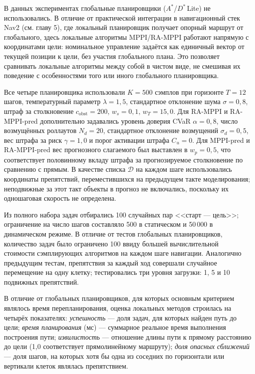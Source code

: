 \documentclass[a4paper,12pt]{extarticle}
\begin{document}
    В данных экспериментах глобальные планировщики ($A^*$/$D^*$\,Lite) не использовались. В отличие от практической интеграции в навигационный стек Nav2 (см. главу 5), где локальный планировщик получает опорный маршрут от глобального, здесь локальные алгоритмы MPPI/RA-MPPI работают напрямую с координатами цели: номинальное управление задаётся как единичный вектор от текущей позиции к цели, без участия глобального плана. Это позволяет сравнивать локальные алгоритмы между собой в чистом виде, не смешивая их поведение с особенностями того или иного глобального планировщика.

    Все четыре планировщика использовали $K = 500$ сэмплов при горизонте $T = 12$ шагов,
    температурный параметр $\lambda = 1{,}5$, стандартное отклонение шума $\sigma = 0{,}8$,
    штраф за столкновение $c_{\text{obst}} = 200$, $w_s = 0{,}1$, $w_T = 15{,}0$.
    Для RA-MPPI и RA-MPPI-pred дополнительно задавались уровень доверия CVaR $\alpha = 0{,}8$,
    число возмущённых роллаутов $N_d = 20$, стандартное отклонение возмущений $\sigma_d = 0{,}5$,
    вес штрафа за риск $\gamma = 1{,}0$ и порог активации штрафа $C_u = 0$.
    Для MPPI-pred и RA-MPPI-pred вес прогнозного слагаемого был выставлен в $w_p = 0{,}5$,
    что соответствует половинному вкладу штрафа за прогнозируемое столкновение по сравнению с прямым.
    В качестве списка $\mathcal{D}$ на каждом шаге использовались координаты препятствий,
    переместившихся на предыдущем такте моделирования; неподвижные за этот такт объекты в прогноз
    не включались, поскольку их одношаговая скорость не определена.

    Из полного набора задач отбирались 100 случайных пар <<старт --- цель>>;
    ограничение на число шагов составляло 500 в статическом и 50\,000 в динамическом режиме.
    В отличие от тестов глобальных планировщиков, количество задач было ограничено 100
    ввиду большей вычислительной стоимости сэмплирующих алгоритмов на каждом шаге навигации.
    Аналогично предыдущим тестам, препятствия за каждый ход совершали случайное перемещение
    на одну клетку; тестировались три уровня загрузки: 1, 5 и 10 подвижных препятствий.

    В отличие от глобальных планировщиков, для которых основным критерием являлось время перепланирования,
    оценка локальных методов строилась на четырёх показателях: \textit{успешность} --- доля задач,
    для которых найден путь до цели; \textit{время планирования} (мс) --- суммарное реальное время выполнения
    построения пути; \textit{извилистость} --- отношение длины пути к прямому расстоянию до цели
    (1{,}0 соответствует прямолинейному маршруту); \textit{доля опасных сближений} ---
    доля шагов, на которых хотя бы одна из соседних по горизонтали или вертикали клеток являлась препятствием.
\end{document}
